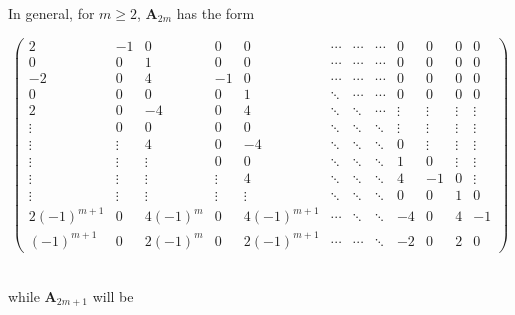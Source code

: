 \documentclass{amsart}
\begin{document}
In general, for $m \geq 2$, ${{\mathbf A}}_{2m}$ has the form

\begin{tiny}

\begin{equation}\label{eqA2m}
\left( \begin{array}{cccccccccccc}
    2&-1&0&0&0&\cdots&\cdots&\cdots&0&0&0&0\\
    0&0&1&0&0&\cdots&\cdots&\cdots&0&0&0&0\\
    -2&0&4&-1&0&\cdots&\cdots&\cdots&0&0&0&0\\
    0&0&0&0&1&\ddots&\cdots&\cdots&0&0&0&0\\
    2&0&-4&0&4&\ddots&\ddots&\cdots&\vdots&\vdots&\vdots&\vdots\\
    \vdots&0&0&0&0&\ddots&\ddots&\ddots&\vdots&\vdots&\vdots&\vdots\\
    \vdots&\vdots&4&0&-4&\ddots&\ddots&\ddots&0&\vdots&\vdots&\vdots\\
    \vdots&\vdots&\vdots&0&0&\ddots&\ddots&\ddots&1&0&\vdots&\vdots\\
    \vdots&\vdots&\vdots&\vdots&4&\ddots&\ddots&\ddots&4&-1&0&\vdots\\
    \vdots&\vdots&\vdots&\vdots&\vdots&\ddots&\ddots&\ddots&0&0&1&0\\
    2(-1)^{m+1}&0&4(-1)^{m}&0&4(-1)^{m+1}&\cdots&\ddots&\ddots&-4&0&4&-1\\
    (-1)^{m+1}&0&2(-1)^{m}&0&2(-1)^{m+1}&\cdots&\cdots&\ddots&-2&0&2&0
\end{array} \right)
\end{equation}\\
\end{tiny}

while ${{\mathbf A}}_{2m+1}$ will be
\end{document}
